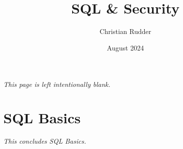 \documentclass{article}
\title{SQL \& Security}
\author{Christian Rudder}
\date{August 2024}
\begin{document}
\maketitle

\tableofcontents

\newpage
\thispagestyle{empty}
\mbox{}
\vfill
\begin{center}
    \textit{This page is left intentionally blank.}
\end{center}
\vfill
\newpage

% 

\section{SQL Basics}




\newpage

\newpage


\vspace{2em}
\begin{center}
    \textit{This concludes SQL Basics.}
\end{center}
\end{document}
